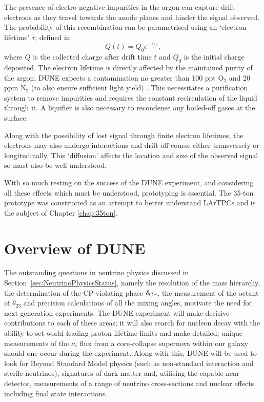The presence of electro-negative impurities in the argon can capture drift electrons as they travel towards the anode planes and hinder the signal observed.  The probability of this recombination can be parametrised using an `electron lifetime' $\tau$, defined in
\begin{equation}\label{eq:ElectronLifetime}
  Q(t) = Q_0 e^{-t/\tau},
\end{equation}
where $Q$ is the collected charge after drift time $t$ and $Q_0$ is the initial charge deposited.  The electron lifetime is directly affected by the maintained purity of the argon; DUNE expects a contamination no greater than 100 ppt O$_2$ and 20 ppm N$_2$ (to also ensure sufficient light yield) \cite{DUNECDR4}.  This necessitates a purification system to remove impurities and requires the constant recirculation of the liquid through it.  A liquifier is also necessary to recondense any boiled-off gases at the surface.

Along with the possibility of lost signal through finite electron lifetimes, the electrons may also undergo interactions and drift off course either transversely or longitudinally.  This `diffusion' affects the location and size of the observed signal so must also be well understood.

With so much resting on the success of the DUNE experiment, and considering all these effects which must be understood, prototyping is essential.  The 35-ton prototype was constructed as an attempt to better understand LArTPCs and is the subject of Chapter \ref{chap:35ton}.

\section{Overview of DUNE}\label{sec:DUNEOverview}

The outstanding questions in neutrino physics discussed in Section~\ref{sec:NeutrinoPhysicsStatus}, namely the resolution of the mass hierarchy, the determination of the CP-violating phase $\delta_{\textnormal{CP}}$, the measurement of the octant of $\theta_{23}$ and precision calculations of all the mixing angles, motivate the need for next generation experiments.  The DUNE experiment will make decisive contributions to each of these areas; it will also search for nucleon decay with the ability to set world-leading proton lifetime limits and make detailed, unique measurements of the $\nu_e$ flux from a core-collapse supernova within our galaxy should one occur during the experiment.  Along with this, DUNE will be used to look for Beyond Standard Model physics (such as non-standard interaction and sterile neutrinos), signatures of dark matter and, utilising the capable near detector, measurements of a range of neutrino cross-sections and nuclear effects including final state interactions.

